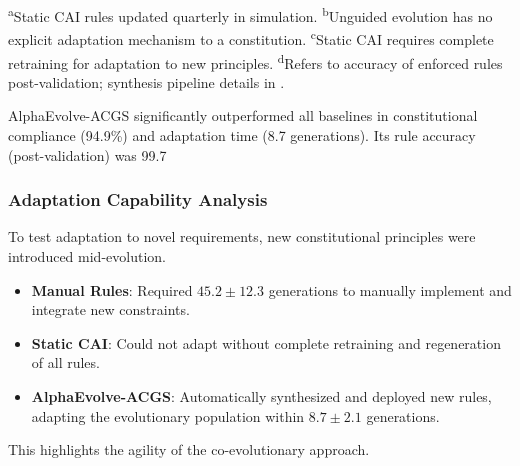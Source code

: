 \documentclass[manuscript,screen,review,anonymous,9pt]{acmart}
\begin{document}
\begin{table}[htbp]
\begin{minipage}{\linewidth}\footnotesize \textsuperscript{a}Static CAI rules updated quarterly in simulation. \textsuperscript{b}Unguided evolution has no explicit adaptation mechanism to a constitution. \textsuperscript{c}Static CAI requires complete retraining for adaptation to new principles. \textsuperscript{d}Refers to accuracy of enforced rules post-validation; synthesis pipeline details in .\end{minipage}
\end{table}
AlphaEvolve-ACGS significantly outperformed all baselines in constitutional compliance (94.9\%) and adaptation time (8.7 generations). Its rule accuracy (post-validation) was 99.7%

\subsubsection{Adaptation Capability Analysis}
To test adaptation to novel requirements, new constitutional principles were introduced mid-evolution.
\begin{itemize}[leftmargin=*,itemsep=1pt,parsep=1pt]
    \item \textbf{Manual Rules}: Required $45.2 \pm 12.3$ generations to manually implement and integrate new constraints.
    \item \textbf{Static CAI}: Could not adapt without complete retraining and regeneration of all rules.
    \item \textbf{AlphaEvolve-ACGS}: Automatically synthesized and deployed new rules, adapting the evolutionary population within $8.7 \pm 2.1$ generations.
\end{itemize}
This highlights the agility of the co-evolutionary approach.
\end{document}
